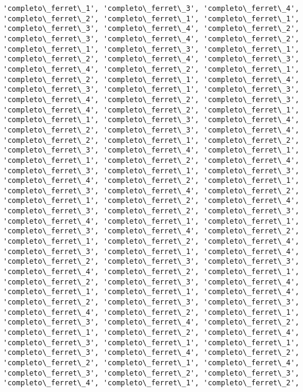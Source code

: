 \documentclass[11pt]{article}
\begin{document}
\begin{Verbatim}[commandchars=\\\{\}]
'completo\_ferret\_1', 'completo\_ferret\_3', 'completo\_ferret\_4',
'completo\_ferret\_2', 'completo\_ferret\_1', 'completo\_ferret\_1',
'completo\_ferret\_3', 'completo\_ferret\_4', 'completo\_ferret\_2',
'completo\_ferret\_3', 'completo\_ferret\_4', 'completo\_ferret\_2',
'completo\_ferret\_1', 'completo\_ferret\_3', 'completo\_ferret\_1',
'completo\_ferret\_2', 'completo\_ferret\_4', 'completo\_ferret\_3',
'completo\_ferret\_4', 'completo\_ferret\_2', 'completo\_ferret\_1',
'completo\_ferret\_2', 'completo\_ferret\_1', 'completo\_ferret\_4',
'completo\_ferret\_3', 'completo\_ferret\_1', 'completo\_ferret\_3',
'completo\_ferret\_4', 'completo\_ferret\_2', 'completo\_ferret\_3',
'completo\_ferret\_4', 'completo\_ferret\_2', 'completo\_ferret\_1',
'completo\_ferret\_1', 'completo\_ferret\_3', 'completo\_ferret\_4',
'completo\_ferret\_2', 'completo\_ferret\_3', 'completo\_ferret\_4',
'completo\_ferret\_2', 'completo\_ferret\_1', 'completo\_ferret\_2',
'completo\_ferret\_3', 'completo\_ferret\_4', 'completo\_ferret\_1',
'completo\_ferret\_1', 'completo\_ferret\_2', 'completo\_ferret\_4',
'completo\_ferret\_3', 'completo\_ferret\_1', 'completo\_ferret\_3',
'completo\_ferret\_4', 'completo\_ferret\_2', 'completo\_ferret\_1',
'completo\_ferret\_3', 'completo\_ferret\_4', 'completo\_ferret\_2',
'completo\_ferret\_1', 'completo\_ferret\_2', 'completo\_ferret\_4',
'completo\_ferret\_3', 'completo\_ferret\_2', 'completo\_ferret\_3',
'completo\_ferret\_4', 'completo\_ferret\_1', 'completo\_ferret\_1',
'completo\_ferret\_3', 'completo\_ferret\_4', 'completo\_ferret\_2',
'completo\_ferret\_1', 'completo\_ferret\_2', 'completo\_ferret\_4',
'completo\_ferret\_3', 'completo\_ferret\_1', 'completo\_ferret\_4',
'completo\_ferret\_2', 'completo\_ferret\_3', 'completo\_ferret\_3',
'completo\_ferret\_4', 'completo\_ferret\_2', 'completo\_ferret\_1',
'completo\_ferret\_2', 'completo\_ferret\_3', 'completo\_ferret\_4',
'completo\_ferret\_1', 'completo\_ferret\_1', 'completo\_ferret\_4',
'completo\_ferret\_2', 'completo\_ferret\_3', 'completo\_ferret\_3',
'completo\_ferret\_4', 'completo\_ferret\_2', 'completo\_ferret\_1',
'completo\_ferret\_3', 'completo\_ferret\_4', 'completo\_ferret\_2',
'completo\_ferret\_1', 'completo\_ferret\_2', 'completo\_ferret\_4',
'completo\_ferret\_3', 'completo\_ferret\_1', 'completo\_ferret\_1',
'completo\_ferret\_3', 'completo\_ferret\_4', 'completo\_ferret\_2',
'completo\_ferret\_2', 'completo\_ferret\_1', 'completo\_ferret\_4',
'completo\_ferret\_3', 'completo\_ferret\_2', 'completo\_ferret\_3',
'completo\_ferret\_4', 'completo\_ferret\_1', 'completo\_ferret\_2',

\end{Verbatim}
\end{document}
